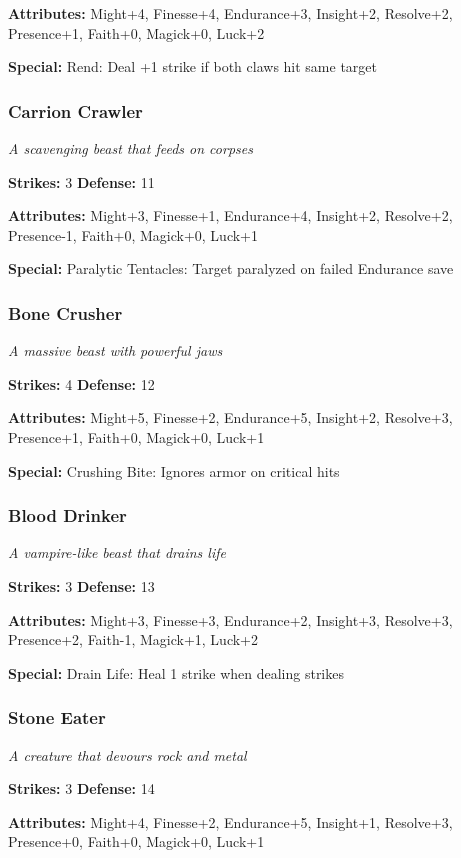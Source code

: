 \documentclass[10pt,twoside]{article}
\begin{document}
\textbf{Attributes:} Might+4, Finesse+4, Endurance+3, Insight+2, Resolve+2, Presence+1, Faith+0, Magick+0, Luck+2

\textbf{Special:} Rend: Deal +1 strike if both claws hit same target

\subsubsection{Carrion Crawler}
\textit{A scavenging beast that feeds on corpses}

\textbf{Strikes:} 3 \quad \textbf{Defense:} 11

\textbf{Attributes:} Might+3, Finesse+1, Endurance+4, Insight+2, Resolve+2, Presence-1, Faith+0, Magick+0, Luck+1

\textbf{Special:} Paralytic Tentacles: Target paralyzed on failed Endurance save

\subsubsection{Bone Crusher}
\textit{A massive beast with powerful jaws}

\textbf{Strikes:} 4 \quad \textbf{Defense:} 12

\textbf{Attributes:} Might+5, Finesse+2, Endurance+5, Insight+2, Resolve+3, Presence+1, Faith+0, Magick+0, Luck+1

\textbf{Special:} Crushing Bite: Ignores armor on critical hits

\subsubsection{Blood Drinker}
\textit{A vampire-like beast that drains life}

\textbf{Strikes:} 3 \quad \textbf{Defense:} 13

\textbf{Attributes:} Might+3, Finesse+3, Endurance+2, Insight+3, Resolve+3, Presence+2, Faith-1, Magick+1, Luck+2

\textbf{Special:} Drain Life: Heal 1 strike when dealing strikes

\subsubsection{Stone Eater}
\textit{A creature that devours rock and metal}

\textbf{Strikes:} 3 \quad \textbf{Defense:} 14

\textbf{Attributes:} Might+4, Finesse+2, Endurance+5, Insight+1, Resolve+3, Presence+0, Faith+0, Magick+0, Luck+1
\end{document}
